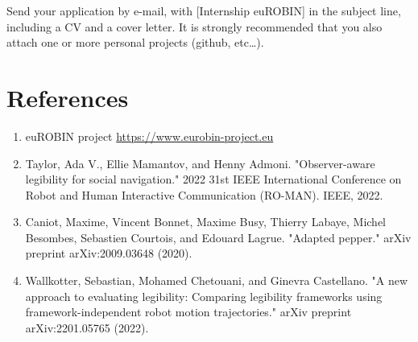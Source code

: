 \documentclass[11pt]{article}
\begin{document}
Send your application by e-mail, with [Internship euROBIN] in the subject line, including a CV and a cover letter.
It is strongly recommended that you also attach one or more personal projects (github, etc…).

    \section{References}
    \begin{enumerate}
        \item euROBIN project \href{https://www.eurobin-project.eu/}{https://www.eurobin-project.eu}
        \item Taylor, Ada V., Ellie Mamantov, and Henny Admoni. "Observer-aware legibility for social navigation." 2022 31st IEEE International Conference on Robot and Human Interactive Communication (RO-MAN). IEEE, 2022.
        \item Caniot, Maxime, Vincent Bonnet, Maxime Busy, Thierry Labaye, Michel Besombes, Sebastien Courtois, and Edouard Lagrue. "Adapted pepper." arXiv preprint arXiv:2009.03648 (2020).
        \item Wallkotter, Sebastian, Mohamed Chetouani, and Ginevra Castellano. "A new approach to evaluating legibility: Comparing legibility frameworks using framework-independent robot motion trajectories." arXiv preprint arXiv:2201.05765 (2022).

    \end{enumerate}
\end{document}
